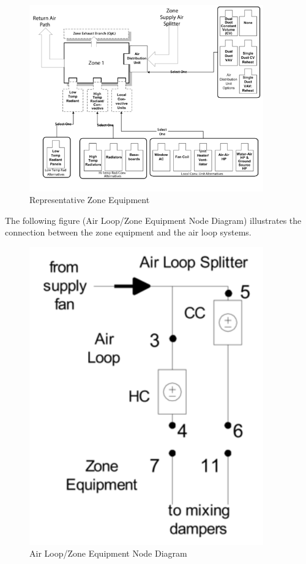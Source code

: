 \begin{figure}[hbtp] %
\centering
\includegraphics[width=0.9\textwidth, height=0.9\textheight, keepaspectratio=true]{media/image262.png}
\caption{Representative Zone Equipment \protect \label{fig:representative-zone-equipment}}
\end{figure}

The following figure (Air Loop/Zone Equipment Node Diagram) illustrates the connection between the zone equipment and the air loop systems.

\begin{figure}[hbtp] %
\centering
\includegraphics[width=0.9\textwidth, height=0.9\textheight, keepaspectratio=true]{media/image263.png}
\caption{Air Loop/Zone Equipment Node Diagram \protect \label{fig:air-loopzone-equipment-node-diagram}}
\end{figure}

